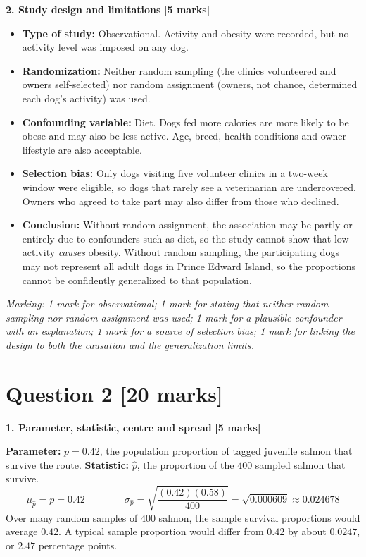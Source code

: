 \documentclass[10pt,letterpaper]{article}
\newcommand{\partmarks}[1]{\hfill\textbf{[#1 marks]}}
\newcommand{\allocation}[1]{\par\smallskip\textit{Marking: #1}\par}
\begin{document}
\textbf{2. Study design and limitations} \partmarks{5}
\begin{itemize}
\item \textbf{Type of study:} Observational. Activity and obesity were recorded, but no activity level was imposed on any dog.
\item \textbf{Randomization:} Neither random sampling (the clinics volunteered and owners self-selected) nor random assignment (owners, not chance, determined each dog's activity) was used.
\item \textbf{Confounding variable:} Diet. Dogs fed more calories are more likely to be obese and may also be less active. Age, breed, health conditions and owner lifestyle are also acceptable.
\item \textbf{Selection bias:} Only dogs visiting five volunteer clinics in a two-week window were eligible, so dogs that rarely see a veterinarian are undercovered. Owners who agreed to take part may also differ from those who declined.
\item \textbf{Conclusion:} Without random assignment, the association may be partly or entirely due to confounders such as diet, so the study cannot show that low activity \emph{causes} obesity. Without random sampling, the participating dogs may not represent all adult dogs in Prince Edward Island, so the proportions cannot be confidently generalized to that population.
\end{itemize}

\allocation{1 mark for observational; 1 mark for stating that neither random sampling nor random assignment was used; 1 mark for a plausible confounder with an explanation; 1 mark for a source of selection bias; 1 mark for linking the design to both the causation and the generalization limits.}

\newpage
\section*{Question 2 \hfill [20 marks]}

\textbf{1. Parameter, statistic, centre and spread} \partmarks{5}

\textbf{Parameter:} $p=0.42$, the population proportion of tagged juvenile salmon that survive the route. \textbf{Statistic:} $\hat p$, the proportion of the $400$ sampled salmon that survive.
$$\mu_{\hat p}=p=0.42 \qquad\qquad \sigma_{\hat p}=\sqrt{\frac{(0.42)(0.58)}{400}}=\sqrt{0.000609}\approx0.024678$$
Over many random samples of $400$ salmon, the sample survival proportions would average $0.42$. A typical sample proportion would differ from $0.42$ by about $0.0247$, or $2.47$ percentage points.
\end{document}
